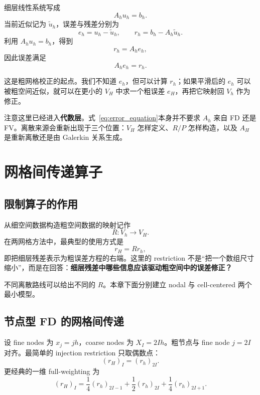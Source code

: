 细层线性系统写成
\begin{equation}
A_hu_h=b_h.
\end{equation}
当前近似记为 $\tilde u_h$，误差与残差分别为
\begin{equation}
e_h=u_h-\tilde u_h,
\qquad
r_h=b_h-A_h\tilde u_h.
\end{equation}
利用 $A_hu_h=b_h$，得到
\begin{equation}
r_h=A_he_h,
\end{equation}
因此误差满足
\begin{equation}
A_he_h=r_h.
\label{eq:error_equation}
\end{equation}

这是粗网格校正的起点。我们不知道 $e_h$，但可以计算 $r_h$；如果平滑后的 $e_h$ 可以被粗空间近似，就可以在更小的 $V_H$ 中求一个粗误差 $e_H$，再把它映射回 $V_h$ 作为修正。

注意这里已经进入\textbf{代数层}。式~\eqref{eq:error_equation}本身并不要求 $A_h$ 来自 FD 还是 FV。离散来源会重新出现于三个位置：$V_H$ 怎样定义、$R/P$ 怎样构造，以及 $A_H$ 是重新离散还是由 Galerkin 关系生成。

\section{网格间传递算子}

\subsection{限制算子的作用}
\label{sec:restriction}

从细空间数据构造粗空间数据的映射记作
\begin{equation}
R:V_h\rightarrow V_H.
\end{equation}
在两网格方法中，最典型的使用方式是
\begin{equation}
r_H=Rr_h,
\label{eq:twogrid-restrict-residual}
\end{equation}
即把细层残差表示为粗误差方程的右端。这里的 restriction 不是“把一个数组尺寸缩小”，而是在回答：\textbf{细层残差中哪些信息应该驱动粗空间中的误差修正？}

不同离散路线可以给出不同的 $R$。本章下面分别建立 nodal 与 cell-centered 两个最小模型。

\subsection{节点型 FD 的网格间传递}

设 fine nodes 为 $x_j=jh$，coarse nodes 为 $X_I=2Ih$。粗节点与 fine node $j=2I$ 对齐。最简单的 injection restriction 只取偶数点：
\begin{equation}
(r_H)_I=(r_h)_{2I}.
\end{equation}
更经典的一维 full-weighting 为
\begin{equation}
(r_H)_I
=\frac14(r_h)_{2I-1}+\frac12(r_h)_{2I}+\frac14(r_h)_{2I+1}.
\label{eq:twogrid-full-weighting-one-dimensional}
\end{equation}

